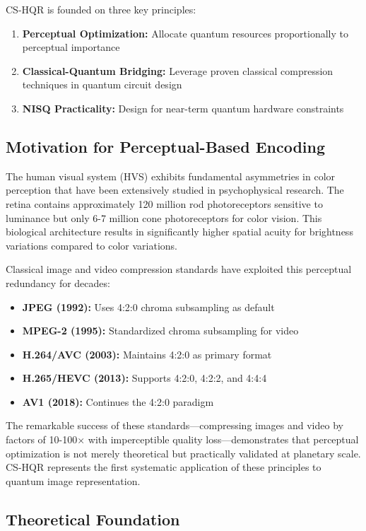 \documentclass[11pt,a4paper]{article}
\begin{document}
CS-HQR is founded on three key principles:

\begin{enumerate}
    \item \textbf{Perceptual Optimization:} Allocate quantum resources proportionally to perceptual importance
    \item \textbf{Classical-Quantum Bridging:} Leverage proven classical compression techniques in quantum circuit design
    \item \textbf{NISQ Practicality:} Design for near-term quantum hardware constraints
\end{enumerate}

\subsection{Motivation for Perceptual-Based Encoding}

The human visual system (HVS) exhibits fundamental asymmetries in color perception that have been extensively studied in psychophysical research. The retina contains approximately 120 million rod photoreceptors sensitive to luminance but only 6-7 million cone photoreceptors for color vision. This biological architecture results in significantly higher spatial acuity for brightness variations compared to color variations.

Classical image and video compression standards have exploited this perceptual redundancy for decades:
\begin{itemize}
    \item \textbf{JPEG (1992):} Uses 4:2:0 chroma subsampling as default
    \item \textbf{MPEG-2 (1995):} Standardized chroma subsampling for video
    \item \textbf{H.264/AVC (2003):} Maintains 4:2:0 as primary format
    \item \textbf{H.265/HEVC (2013):} Supports 4:2:0, 4:2:2, and 4:4:4
    \item \textbf{AV1 (2018):} Continues the 4:2:0 paradigm
\end{itemize}

The remarkable success of these standards—compressing images and video by factors of 10-100× with imperceptible quality loss—demonstrates that perceptual optimization is not merely theoretical but practically validated at planetary scale. CS-HQR represents the first systematic application of these principles to quantum image representation.

\subsection{Theoretical Foundation}
\end{document}
